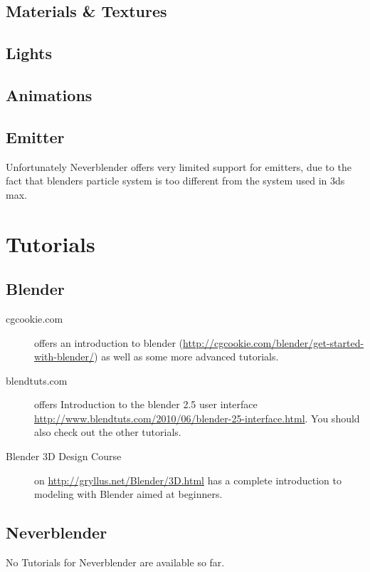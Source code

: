 \documentclass[a4paper]{article}
\begin{document}
\subsection{Materials \& Textures}

\subsection{Lights}

\subsection{Animations}

\subsection{Emitter}
Unfortunately Neverblender offers very limited support for emitters, due to the fact that blenders particle system is too different from the system used in 3ds max.
\section{Tutorials}

\subsection{Blender}
\begin{description}
    \item[cgcookie.com] offers an introduction to blender (\url{http://cgcookie.com/blender/get-started-with-blender/}) as well as some more advanced tutorials.
    \item[blendtuts.com] offers Introduction to the blender 2.5 user interface \url{http://www.blendtuts.com/2010/06/blender-25-interface.html}. You should also check out the other tutorials.
    \item[Blender 3D Design Course] on \url{http://gryllus.net/Blender/3D.html} has a complete introduction to modeling with Blender aimed at beginners.
\end{description}

\subsection{Neverblender}
No Tutorials for Neverblender are available so far.
\end{document}
